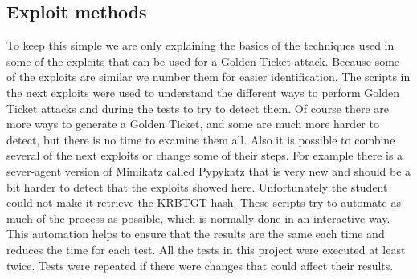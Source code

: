 \subsection{Exploit methods}
To keep this simple we are only explaining the basics of the techniques used in some of the exploits that can be used for a Golden Ticket attack. Because some of the exploits are similar we number them for easier identification. The scripts in the next exploits were used to understand the different ways to perform Golden Ticket attacks and during the tests to try to detect them. Of course there are more ways to generate a Golden Ticket, and some are much more harder to detect, but there is no time to examine them all. Also it is possible to combine several of the next exploits or change some of their steps.
\linej
For example there is a sever-agent version of Mimikatz called Pypykatz\cite{pypykatz_agent}\cite{pypykatz_server} that is very new and should be a bit harder to detect that the exploits showed here. Unfortunately the student could not make it retrieve the KRBTGT hash.
\linej
\linej
These scripts try to automate as much of the process as possible, which is normally done in an interactive way. This automation helps to ensure that the results are the same each time and reduces the time for each test. All the tests in this project were executed at least twice. Tests were repeated if there were changes that could affect their results.

